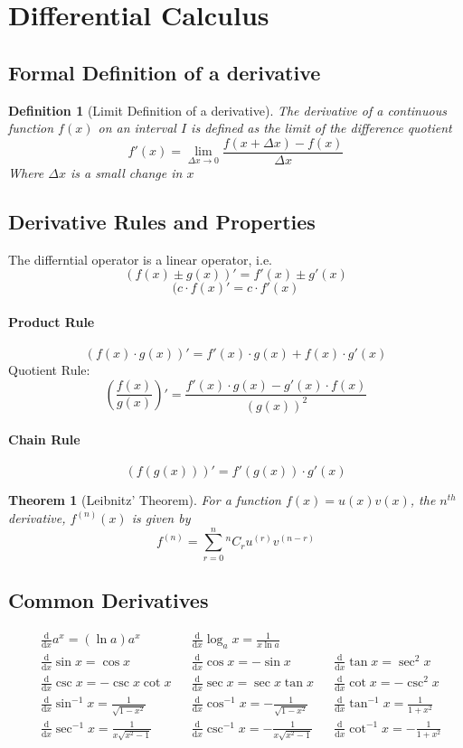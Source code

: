 \documentclass[12pt]{article}
\newcommand{\diff}[1]{\frac{\mathrm{d}}{\mathrm{d}#1}}
\newtheorem{thrm}{Theorem}
\newtheorem{defn}{Definition}
\begin{document}
\section{Differential Calculus}
\subsection{Formal Definition of a derivative}
\begin{defn}[Limit Definition of a derivative]
	The derivative of a continuous function $f(x)$ on an interval $I$ is defined as the limit of the difference quotient
	$$f'(x) = \lim_{\Delta x \to 0}{\frac{f(x + \Delta x) - f(x)}{\Delta x}}$$
	Where $\Delta x$ is a small change in $x$
\end{defn}
\subsection{Derivative Rules and Properties}
The differntial operator is a linear operator, i.e.\,
$${(f(x) \pm g(x))}' = f'(x) \pm g'(x)$$ 
$${(c\cdot f(x)}' = c\cdot f'(x)$$
\paragraph{Product Rule}
$$(f(x)\cdot g(x))' = f'(x)\cdot g(x) + f(x)\cdot g'(x)$$
Quotient Rule:
$$\left(\frac{f(x)}{g(x)}\right)' = \frac{f'(x)\cdot g(x) - g'(x)\cdot f(x)}{(g(x))^2}$$
\paragraph{Chain Rule}
$$ (f(g(x)))' = f'(g(x))\cdot g'(x)$$
\begin{thrm}[Leibnitz' Theorem]
	For a function $f(x) = u(x)v(x)$, the ${n^{th}}$ derivative, $f^{(n)}(x)$ is given by
	$$f^{(n)}= \sum_{r=0}^{n}{^nC_r u^{(r)}v^{(n-r)}}$$
\end{thrm}
\subsection{Common Derivatives}
\begin{align*}
&\diff{x}a^x = (\ln a)a^x & &\diff{x}\log_a x = \frac{1}{x\ln a} \\
&\diff{x}\sin x = \cos x & &\diff{x}\cos x = -\sin x & &\diff{x}\tan x = \sec^2 x\\
&\diff{x}\csc x = -\csc x \cot x & &\diff{x}\sec x = \sec x \tan x & &\diff{x}\cot x = -\csc^2 x \\
&\diff{x}\sin^{-1}x = \frac{1}{\sqrt{1 - x^2}} & &\diff{x}\cos^{-1}x = - \frac{1}{\sqrt{1 - x^2}} & &\diff{x}\tan^{-1}x = \frac{1}{1 + x^2} \\
&\diff{x}\sec^{-1}x = \frac{1}{ x \sqrt{x^2 - 1}} &  &\diff{x}\csc^{-1}x = -\frac{1}{ x \sqrt{x^2 - 1}} & &\diff{x}\cot^{-1}x = -\frac{1}{1 + x^2} \\
\end{align*}
\end{document}
